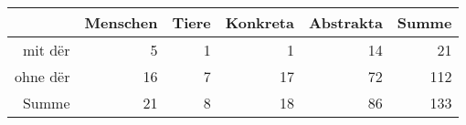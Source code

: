\begin{tabular}{rrrrrr}
  \hline
 & Menschen & Tiere & Konkreta & Abstrakta & Summe \\ 
  \hline
mit dër & 5 & 1 & 1 & 14 & 21 \\ 
  ohne dër & 16 & 7 & 17 & 72 & 112 \\ 
  Summe & 21 & 8 & 18 & 86 & 133 \\ 
   \hline
\end{tabular}
